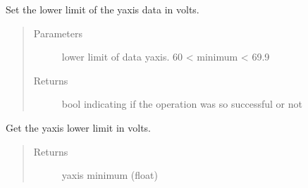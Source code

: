 \documentclass[letterpaper,10pt,english]{sphinxmanual}
\begin{document}
\begin{fulllineitems}
\label{\detokenize{settings_interface:settings_interface.set_y_axis_min}}
Set the lower limit of the y\sphinxhyphen{}axis data in volts.
\begin{quote}\begin{description}
\item[{Parameters}] \leavevmode
{} \textendash{} lower limit of data y\sphinxhyphen{}axis. \sphinxhyphen{}60 \textless{} minimum \textless{} 69.9

\item[{Returns}] \leavevmode
bool indicating if the operation was so successful or not

\end{description}\end{quote}

\end{fulllineitems}


\begin{fulllineitems}
\label{\detokenize{settings_interface:settings_interface.get_y_axis_min}}
Get the y\sphinxhyphen{}axis lower limit in volts.
\begin{quote}\begin{description}
\item[{Returns}] \leavevmode
y\sphinxhyphen{}axis minimum (float)

\end{description}\end{quote}

\end{fulllineitems}

\end{document}
